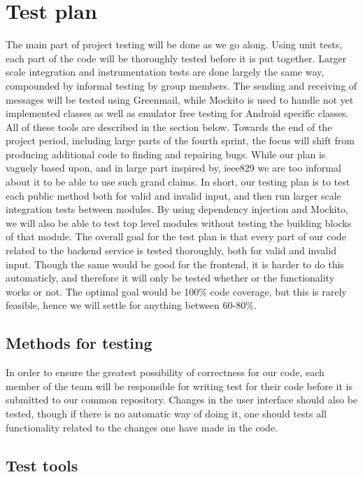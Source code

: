 \chapter{Test plan}

The main part of project testing will be done as we go along. Using unit tests, each part of the code will be thoroughly tested before it is put together. Larger scale integration and instrumentation tests are done largely the same way, compounded by informal testing by group members. The sending and receiving of messages will be tested using Greenmail, while Mockito is used to handle not yet implemented classes as well as emulator free testing for Android specific classes. All of these tools are described in the section below. Towards the end of the project period, including large parts of the fourth sprint, the focus will shift from producing additional code to finding and repairing bugs. While our plan is vaguely based upon, and in large part inspired by, \gls{ieee829} \cite{bib:ieee} we are too informal about it to be able to use such grand claims. In short, our testing plan is to test each public method both for valid and invalid input, and then run larger scale integration tests between modules.
By using dependency injection and Mockito, we will also be able to test top level modules without testing the building blocks of that module. 
\newline
\newline
The overall goal for the test plan is that every part of our code related to the backend service is tested thoroughly, both for valid and invalid input. Though the same would be good for the frontend,
it is harder to do this automaticly, and therefore it will only be tested whether or the functionality works or not. The optimal goal would be 100\% code coverage, but this is rarely feasible, hence
we will settle for anything between 60-80\%. 

\section{Methods for testing}
In order to ensure the greatest possibility of correctness for our code, each member of the team will be responsible for writing test for their code before it is submitted to our common repository.
Changes in the user interface should also be tested, though if there is no automatic way of doing it, one should tests all functionality related to the changes one have made in the code. 

\section{Test tools}
